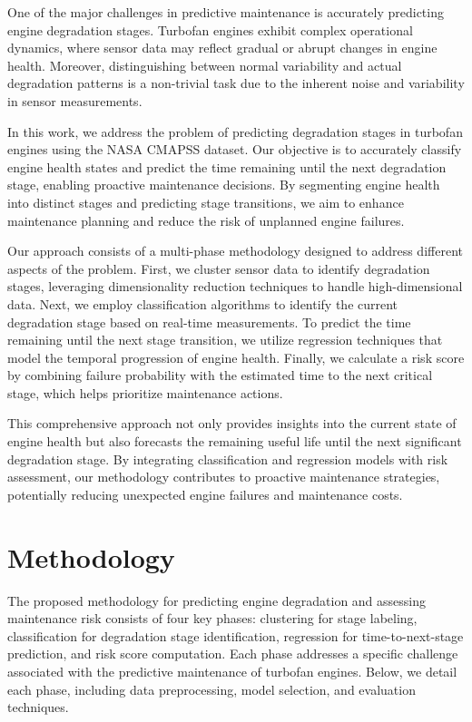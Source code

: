 \documentclass[conference]{IEEEtran}
\begin{document}
One of the major challenges in predictive maintenance is accurately predicting engine degradation stages. Turbofan engines exhibit complex operational dynamics, where sensor data may reflect gradual or abrupt changes in engine health. Moreover, distinguishing between normal variability and actual degradation patterns is a non-trivial task due to the inherent noise and variability in sensor measurements.

In this work, we address the problem of predicting degradation stages in turbofan engines using the NASA CMAPSS dataset. Our objective is to accurately classify engine health states and predict the time remaining until the next degradation stage, enabling proactive maintenance decisions. By segmenting engine health into distinct stages and predicting stage transitions, we aim to enhance maintenance planning and reduce the risk of unplanned engine failures.

Our approach consists of a multi-phase methodology designed to address different aspects of the problem. First, we cluster sensor data to identify degradation stages, leveraging dimensionality reduction techniques to handle high-dimensional data. Next, we employ classification algorithms to identify the current degradation stage based on real-time measurements. To predict the time remaining until the next stage transition, we utilize regression techniques that model the temporal progression of engine health. Finally, we calculate a risk score by combining failure probability with the estimated time to the next critical stage, which helps prioritize maintenance actions.

This comprehensive approach not only provides insights into the current state of engine health but also forecasts the remaining useful life until the next significant degradation stage. By integrating classification and regression models with risk assessment, our methodology contributes to proactive maintenance strategies, potentially reducing unexpected engine failures and maintenance costs.


\section{Methodology}

The proposed methodology for predicting engine degradation and assessing maintenance risk consists of four key phases: clustering for stage labeling, classification for degradation stage identification, regression for time-to-next-stage prediction, and risk score computation. Each phase addresses a specific challenge associated with the predictive maintenance of turbofan engines. Below, we detail each phase, including data preprocessing, model selection, and evaluation techniques.
\end{document}
